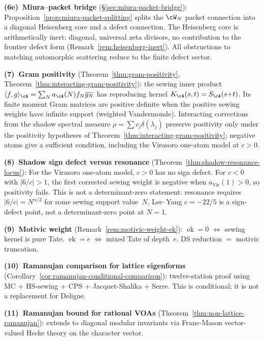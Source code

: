 \smallskip\noindent
\textbf{(6e)~Miura--packet bridge}
(\S\ref{sec:miura-packet-bridge}):
Proposition~\ref{prop:miura-packet-splitting} splits the
$\cW_N$ packet connection into a diagonal Heisenberg core
and a defect connection. The Heisenberg core is
arithmetically inert: diagonal, universal zeta divisors,
no contribution to the frontier defect form
(Remark~\ref{rem:heisenberg-inert}). All obstructions to
matching automorphic scattering reduce to the finite defect
sector.

\smallskip\noindent
\textbf{(7)~Gram positivity}
(Theorem~\ref{thm:gram-positivity},
Theorem~\ref{thm:interacting-gram-positivity}):
the sewing inner product
$\langle f,g\rangle_\cA = \sum_N a_\cA(N)f_N\overline{g_N}$
has reproducing kernel $K_\cA(s,t) = S_\cA(s{+}t)$.
Its finite moment Gram matrices are positive definite when the
positive sewing weights have infinite support
(weighted Vandermonde).
Interacting corrections from the shadow spectral
measure $\rho = \sum c_j\delta(\lambda_j)$ preserve positivity only
under the positivity hypotheses of
Theorem~\ref{thm:interacting-gram-positivity}; negative atoms give a
sufficient condition, including the Virasoro one-atom model at
$c>0$.

\smallskip\noindent
\textbf{(8)~Shadow sign defect versus resonance}
(Theorem~\ref{thm:shadow-resonance-locus}):
For the Virasoro one-atom model, $c>0$ has no sign defect.  For
$c<0$ with $|6/c|>1$, the first corrected sewing weight is negative
when $a_{\mathrm{Vir}}(1)>0$, so positivity fails. This is not a
determinant-zero statement: resonance requires
$|6/c|=N^{\alpha/2}$ for some sewing support value~$N$.
Lee--Yang $c=-22/5$ is a sign-defect point, not a determinant-zero
point at $N=1$.

\smallskip\noindent
\textbf{(9)~Motivic weight}
(Remark~\ref{rem:motivic-weight-ek}):
$\operatorname{ek} = 0$ $\Leftrightarrow$ sewing
kernel is pure Tate.
$\operatorname{ek} = e$ $\Leftrightarrow$ mixed Tate
of depth~$e$.
DS reduction $=$ motivic truncation.

\smallskip\noindent
\textbf{(10)~Ramanujan comparison for lattice eigenforms}
(Corollary~\ref{cor:ramanujan-conditional-comparison}):
twelve-station proof using MC + HS-sewing + CPS + Jacquet-Shalika + Serre.
This is conditional; it is not a replacement for Deligne.

\smallskip\noindent
\textbf{(11)~Ramanujan bound for rational VOAs}
(Theorem~\ref{thm:non-lattice-ramanujan}):
extends to diagonal modular invariants via Franc-Mason
vector-valued Hecke theory on the character vector.

